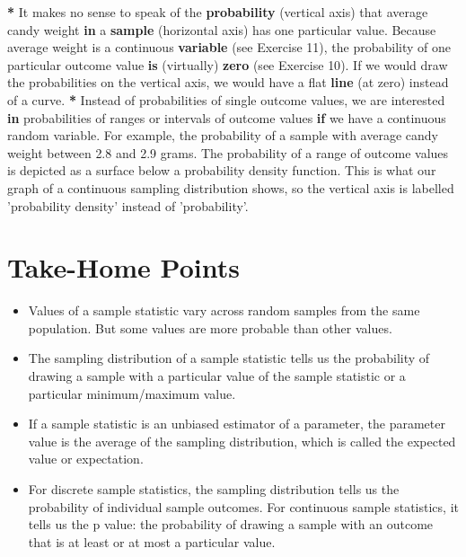 \documentclass[a4paper]{book}
\newenvironment{Shaded}{\begin{snugshade}}{\end{snugshade}}
\newcommand{\KeywordTok}[1]{\textcolor[rgb]{0,0,0}{\textbf{#1}}}
\newcommand{\DecValTok}[1]{\textcolor[rgb]{0.00,0.00,0.00}{#1}}
\newcommand{\FloatTok}[1]{\textcolor[rgb]{0.00,0.00,0.00}{#1}}
\newcommand{\StringTok}[1]{\textcolor[rgb]{0.00,0.00,0.00}{#1}}
\newcommand{\ControlFlowTok}[1]{\textcolor[rgb]{0.00,0.00,0.00}{\textbf{#1}}}
\newcommand{\OperatorTok}[1]{\textcolor[rgb]{0.00,0.00,0.00}{\textbf{#1}}}
\newcommand{\NormalTok}[1]{#1}
\theoremstyle{definition}
\theoremstyle{definition}
\theoremstyle{definition}
\theoremstyle{remark}
\begin{document}
\begin{Shaded}
\begin{Highlighting}[]
\OperatorTok{*}\StringTok{ }\NormalTok{It makes no sense to speak of the }\KeywordTok{probability}\NormalTok{ (vertical axis) that average}
\NormalTok{candy weight }\ControlFlowTok{in}\NormalTok{ a }\KeywordTok{sample}\NormalTok{ (horizontal axis) has one particular value. Because}
\NormalTok{average weight is a continuous }\KeywordTok{variable}\NormalTok{ (see Exercise }\DecValTok{11}\NormalTok{), the probability of}
\NormalTok{one particular outcome value }\KeywordTok{is}\NormalTok{ (virtually) }\KeywordTok{zero}\NormalTok{ (see Exercise }\DecValTok{10}\NormalTok{). If we would}
\NormalTok{draw the probabilities on the vertical axis, we would have a flat }\KeywordTok{line}\NormalTok{ (at}
\NormalTok{zero) instead of a curve.}
\OperatorTok{*}\StringTok{ }\NormalTok{Instead of probabilities of single outcome values, we are interested }\ControlFlowTok{in}
\NormalTok{probabilities of ranges or intervals of outcome values }\ControlFlowTok{if}\NormalTok{ we have a continuous}
\NormalTok{random variable. For example, the probability of a sample with average candy}
\NormalTok{weight between }\FloatTok{2.8}\NormalTok{ and }\FloatTok{2.9}\NormalTok{ grams. The probability of a range of outcome values}
\NormalTok{is depicted as a surface below a probability density function. This is what}
\NormalTok{our graph of a continuous sampling distribution shows, so the vertical axis is}
\NormalTok{labelled }\StringTok{'probability density'}\NormalTok{ instead of }\StringTok{'probability'}\NormalTok{.}
\end{Highlighting}
\end{Shaded}

\section{Take-Home Points}\label{take-home-points}

\begin{itemize}
\item
  Values of a sample statistic vary across random samples from the same
  population. But some values are more probable than other values.
\item
  The sampling distribution of a sample statistic tells us the
  probability of drawing a sample with a particular value of the sample
  statistic or a particular minimum/maximum value.
\item
  If a sample statistic is an unbiased estimator of a parameter, the
  parameter value is the average of the sampling distribution, which is
  called the expected value or expectation.
\item
  For discrete sample statistics, the sampling distribution tells us the
  probability of individual sample outcomes. For continuous sample
  statistics, it tells us the p value: the probability of drawing a
  sample with an outcome that is at least or at most a particular value.
\end{itemize}
\end{document}
